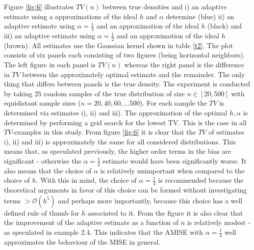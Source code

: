 \documentclass[
twoside,
openright,
titlepage,
numbers=noenddot,
headinclude,%
footinclude=true,
dottedtoc, %
ngerman,
american, %
pagesize=pdftex,
]{book}
\begin{document}
\begin{example}
		Figure \ref{fig:6} illustrates $TV(n)$ between true densities and i) an adaptive estimate using a approximations of the ideal $h$ and $\alpha$ determine (blue) ii) an adaptive estimate using $\alpha=\frac{1}{4}$ and an approximation of the ideal $h$ (black) and iii) an adaptive estimate using $\alpha=\frac{1}{2}$ and an approximation of the ideal $h$ (brown). All estimates use the Gaussian kernel shown in table \ref{t2}. The plot consists of six panels each consisting of two figures (being horizontal neighbors). The left figure in each panel is $TV(n)$ whereas the right panel is the difference in $TV$ between the approximately optimal estimate and the remainder. The only thing that differs between panels is the true density. \newline	
		The experiment is conducted by taking $25$ random samples of the true distribution of size $n\in [20,500]$ with equidistant sample sizes ($n=20,40,60,\dots 500$). For each sample the $TV$ is determined via estimates i), ii) and iii). The approximation of the optimal $h,\alpha$ is determined by performing a grid search for the lowest TV. This is the case in all $TV$-examples in this study. \newline
		From figure \ref{fig:6} it is clear that the $TV$ of estimates i), ii) and iii) is approximately the same for all considered distributions. This means that, as speculated previously, the higher order terms in the bias are significant - otherwise the $\alpha=\frac{1}{2}$ estimate would have been significantly worse. It also means that the choice of $\alpha$ is relatively unimportant when compared to the choice of $h$. With this in mind, the choice of $\alpha=\frac{1}{4}$ is recommended because the theoretical arguments in favor of this choice can be formed without investigating terms $>\mathcal{O}(h^5)$ and perhaps more importantly, because this choice has a well defined rule of thumb for $h$ associated to it.\newline
		From the figure it is also clear that the improvement of the adaptive estimate as a function of $n$ is relatively modest - as speculated in example 2.4. This indicates that the AMISE with $\alpha=\frac{1}{4}$ well approximates the behaviour of the MISE in general.
	\end{example}
	
\end{document}
